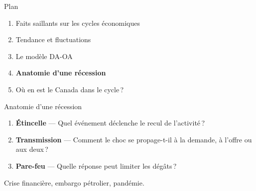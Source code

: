 \documentclass[aspectratio=169]{beamer}
\begin{document}
\begin{frame}{Plan}
   \begin{enumerate}
      \setlength\itemsep{0.5cm}
      \item {\color{gray!50}Faits saillants sur les cycles économiques}
      \item {\color{gray!50}Tendance et fluctuations}
      \item {\color{gray!50}Le modèle DA-OA}
      \item \textbf{Anatomie d'une récession}
      \item Où en est le Canada dans le cycle\,?
   \end{enumerate}
\end{frame}


\begin{frame}{Anatomie d’une récession}
   \begin{enumerate}
      \setlength\itemsep{0.29cm}
      \item \textbf{Étincelle} — Quel événement déclenche le recul de l’activité\,?
      \item \textbf{Transmission} — Comment le choc se propage-t-il à la demande, à l’offre ou aux deux\,?
      \item \textbf{Pare-feu} — Quelle réponse peut limiter les dégâts\,?
   \end{enumerate}
   \vspace{0.2cm}
   \begin{bizimplication}
      Crise financière, embargo pétrolier, pandémie.
   \end{bizimplication}
\end{frame}
\end{document}
